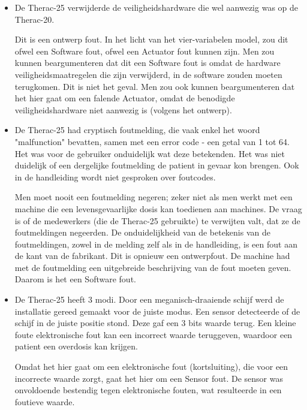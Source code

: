 \documentclass{article}
\begin{document}
				\begin{itemize}
					\item De Therac-25 verwijderde de veiligheidshardware die wel aanwezig was op de Therac-20. \par
						
						Dit is een ontwerp fout. In het licht van het vier-variabelen model, zou dit ofwel een Software fout, ofwel een Actuator fout kunnen zijn. Men zou kunnen beargumenteren dat dit een Software fout is omdat de hardware veiligheidsmaatregelen die zijn verwijderd, in de software zouden moeten terugkomen. Dit is niet het geval. Men zou ook kunnen beargumenteren dat het hier gaat om een falende Actuator, omdat de benodigde veiligheidshardware niet aanwezig is (volgens het ontwerp). \par

					\item De Therac-25 had cryptisch foutmelding, die vaak enkel het woord "malfunction" bevatten, samen met een error code - een getal van 1 tot 64. Het was voor de gebruiker onduidelijk wat deze betekenden. Het was niet duidelijk of een dergelijke foutmelding de patient in gevaar kon brengen. Ook in de handleiding wordt niet gesproken over foutcodes. \par

						Men moet nooit een foutmelding negeren; zeker niet als men werkt met een machine die een levensgevaarlijke dosis kan toedienen aan machines. De vraag is of de medewerkers (die de Therac-25 gebruikte) te verwijten valt, dat ze de foutmeldingen negeerden. De onduidelijkheid van de betekenis van de foutmeldingen, zowel in de melding zelf als in de handleiding, is een fout aan de kant van de fabrikant. Dit is opnieuw een ontwerpfout. De machine had met de foutmelding een uitgebreide beschrijving van de fout moeten geven. Daarom is het een Software fout. \par

					\item De Therac-25 heeft 3 modi. Door een meganisch-draaiende schijf werd de installatie gereed gemaakt voor de juiste modus. Een sensor detecteerde of de schijf in de juiste positie stond. Deze gaf een 3 bits waarde terug. Een kleine foute elektronische fout kan een incorrect waarde teruggeven, waardoor een patient een overdosis kan krijgen. \par

						Omdat het hier gaat om een elektronische fout (kortsluiting), die voor een incorrecte waarde zorgt, gaat het hier om een Sensor fout. De sensor was onvoldoende bestendig tegen elektronische fouten, wat resulteerde in een foutieve waarde. \par


\end{itemize}
\end{document}
